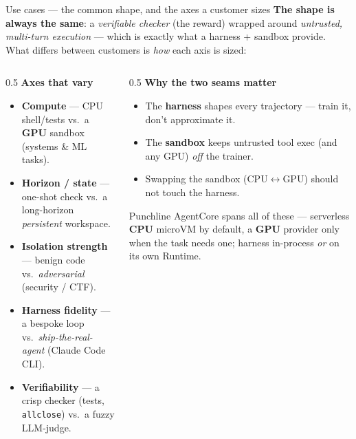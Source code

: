 \documentclass[aspectratio=169]{beamer}
\begin{document}
\begin{frame}{Use cases --- the common shape, and the axes a customer sizes}
  \footnotesize\textbf{The shape is always the same}: a \emph{verifiable checker} (the reward) wrapped
  around \emph{untrusted, multi-turn execution} --- which is exactly what a harness + sandbox provide.
  What differs between customers is \emph{how} each axis is sized:
  \vspace{0.2em}
  \begin{columns}[T]
    \begin{column}{0.5\textwidth}
      \textbf{Axes that vary}
      \begin{itemize}\setlength\itemsep{0.15em}
        \item \textbf{Compute} --- CPU shell/tests vs.\ a \textbf{GPU} sandbox (systems \& ML tasks).
        \item \textbf{Horizon / state} --- one-shot check vs.\ a long-horizon \emph{persistent} workspace.
        \item \textbf{Isolation strength} --- benign code vs.\ \emph{adversarial} (security / CTF).
        \item \textbf{Harness fidelity} --- a bespoke loop vs.\ \emph{ship-the-real-agent} (Claude Code CLI).
        \item \textbf{Verifiability} --- a crisp checker (tests, \texttt{allclose}) vs.\ a fuzzy LLM-judge.
      \end{itemize}
    \end{column}
    \begin{column}{0.5\textwidth}
      \textbf{Why the two seams matter}
      \begin{itemize}\setlength\itemsep{0.15em}
        \item The \textbf{harness} shapes every trajectory --- train it, don't approximate it.
        \item The \textbf{sandbox} keeps untrusted tool exec (and any GPU) \emph{off} the trainer.
        \item Swapping the sandbox (CPU$\leftrightarrow$GPU) should not touch the harness.
      \end{itemize}
      \vspace{0.3em}
      \begin{block}{Punchline}
        \scriptsize AgentCore spans all of these --- serverless \textbf{CPU} microVM by default, a
        \textbf{GPU} provider only when the task needs one; harness in-process \emph{or} on its own Runtime.
      \end{block}
    \end{column}
  \end{columns}
\end{frame}
\end{document}
